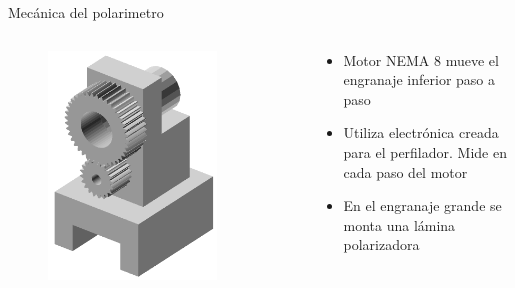 \begin{frame}{Mecánica del polarimetro}
    \begin{columns}
        \begin{column}{0.5\textwidth}
            \begin{figure}[H]
                \centering
                \includegraphics[width=0.8\textwidth]{fig/polarimetro/soporte_all}
                \label{fig:polarimetro/soporte_all}
            \end{figure}
        \end{column}
        \begin{column}{0.5\textwidth}
            \begin{itemize}
                \item Motor NEMA 8 mueve el engranaje inferior paso a paso
                \item Utiliza electrónica creada para el perfilador. Mide en cada paso del motor
                \item En el engranaje grande se monta una lámina polarizadora
            \end{itemize} 
        \end{column}
    \end{columns}
\end{frame}

